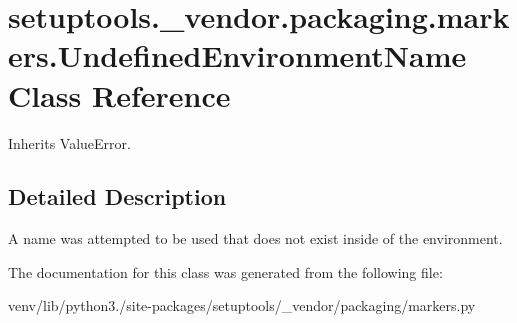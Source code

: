 \hypertarget{classsetuptools_1_1__vendor_1_1packaging_1_1markers_1_1_undefined_environment_name}{}\section{setuptools.\+\_\+vendor.\+packaging.\+markers.\+Undefined\+Environment\+Name Class Reference}
\label{classsetuptools_1_1__vendor_1_1packaging_1_1markers_1_1_undefined_environment_name}


Inherits Value\+Error.



\subsection{Detailed Description}
\begin{DoxyVerb}A name was attempted to be used that does not exist inside of the
environment.
\end{DoxyVerb}
 

The documentation for this class was generated from the following file\+:\begin{DoxyCompactItemize}
\item 
venv/lib/python3./site-\/packages/setuptools/\+\_\+vendor/packaging/markers.\+py\end{DoxyCompactItemize}
